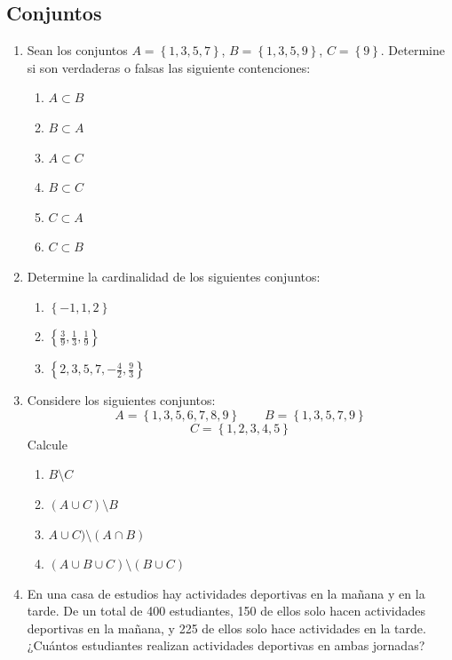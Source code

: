 \documentclass[11pt, twoside]{memoir}
\newcommand{\set}[1]{\left\lbrace #1 \right\rbrace}
\begin{document}
\subsection*{Conjuntos}
\begin{enumerate}
    \item Sean los conjuntos \(A=\set{1,3,5,7}\), \(B=\set{1,3,5,9}\), \(C=\set{9}\).
        Determine si son verdaderas o falsas las siguiente contenciones:
        \begin{multicols}{2}
        \begin{enumerate}[label=\alph*)]
            \item \(A\subset B\)
            \item \(B\subset A\)
            \item \(A\subset C\)
            \item \(B\subset C\)
            \item \(C\subset A\)
            \item \(C\subset B\)
        \end{enumerate}
        \end{multicols}
    \item Determine la cardinalidad de los siguientes conjuntos:
        \begin{enumerate}[label=\alph*)]
            \item \(\set{-1, 1,2}\)
            \item \(\set{\frac39,\frac13,\frac19}\)
            \item \(\set{2,3,5,7,-\frac42,\frac93}\)
        \end{enumerate}
    \item Considere los siguientes conjuntos:
        \[A=\set{1,3,5,6,7,8,9}\qquad B=\set{1,3,5,7,9}\]
        \[C=\set{1,2,3,4,5}\]
        Calcule
        \begin{multicols}{2}
        \begin{enumerate}
            \item \(B\setminus C\)
            \item \((A\cup C)\setminus B\)
            \item \(A\cup C)\setminus (A\cap B)\)
            \item \((A\cup B \cup C)\setminus(B\cup C)\)
        \end{enumerate}
        \end{multicols}
    \item En una casa de estudios hay actividades deportivas en la mañana y en la tarde. De un total de 400 estudiantes, 150 de ellos solo hacen actividades deportivas en la mañana, y 225 de ellos solo hace actividades en la tarde. ¿Cuántos estudiantes realizan actividades deportivas en ambas jornadas?

\end{enumerate}
\end{document}
